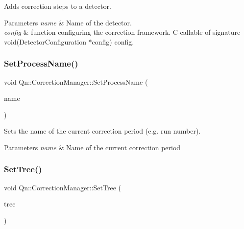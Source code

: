 Adds correction steps to a detector. 


\begin{DoxyParams}{Parameters}
{\em name} & Name of the detector. \\
\hline
{\em config} & function configuring the correction framework. C-\/callable of signature void(\+Detector\+Configuration $\ast$config) config. \\
\hline
\end{DoxyParams}
\mbox{\label{classQn_1_1CorrectionManager_a7f23710ef8fc0babde47c95a0286e883}} 
\subsubsection{\texorpdfstring{Set\+Process\+Name()}{SetProcessName()}}
{\footnotesize\ttfamily void Qn\+::\+Correction\+Manager\+::\+Set\+Process\+Name (\begin{DoxyParamCaption}\item[{std\+::string}]{name }\end{DoxyParamCaption})\hspace{0.3cm}{\ttfamily [inline]}}



Sets the name of the current correction period (e.\+g. run number). 


\begin{DoxyParams}{Parameters}
{\em name} & Name of the current correction period \\
\hline
\end{DoxyParams}
\mbox{\label{classQn_1_1CorrectionManager_adeb5d64691b7e5a05cdc2f4cdae71880}} 
\subsubsection{\texorpdfstring{Set\+Tree()}{SetTree()}}
{\footnotesize\ttfamily void Qn\+::\+Correction\+Manager\+::\+Set\+Tree (\begin{DoxyParamCaption}\item[{T\+Tree $\ast$}]{tree }\end{DoxyParamCaption})\hspace{0.3cm}{\ttfamily [inline]}}



